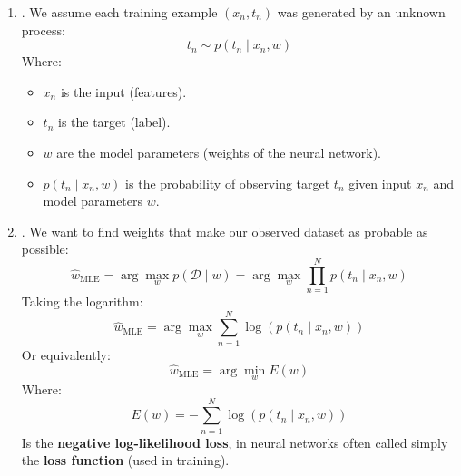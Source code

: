 \begin{enumerate}
    \item {}. We assume each training example $\left(x_{n}, t_{n}\right)$ was generated by an unknown process:
    \begin{equation*}
        t_{n} \sim p\left(t_{n} \mid x_{n}, w\right)
    \end{equation*}
    Where:
    \begin{itemize}
        \item $x_{n}$ is the input (features).
        \item $t_{n}$ is the target (label).
        \item $w$ are the model parameters (weights of the neural network).
        \item $p\left(t_{n} \mid x_{n}, w\right)$ is the probability of observing target $t_{n}$ given input $x_{n}$ and model parameters $w$.
    \end{itemize}

    \item {}. We want to find weights that make our observed dataset as probable as possible:
    \begin{equation*}
        \hat{w}_{\text{MLE}} = \arg\max_{w} p\left(\mathcal{D} \mid w\right) = \arg\max_{w} \prod_{n=1}^{N} p\left(t_{n} \mid x_{n}, w\right)
    \end{equation*}
    Taking the logarithm:
    \begin{equation*}
        \hat{w}_{\text{MLE}} = \arg\max_{w} \sum_{n=1}^{N} \log \left(p\left(t_{n} \mid x_{n}, w\right)\right)
    \end{equation*}
    Or equivalently:
    \begin{equation*}
        \hat{w}_{\text{MLE}} = \arg\min_{w} E(w)
    \end{equation*}
    Where:
    \begin{equation*}
        E(w) = -\sum_{n=1}^{N} \log \left(p\left(t_{n} \mid x_{n}, w\right)\right)
    \end{equation*}
    Is the \textbf{negative log-likelihood loss}, in neural networks often called simply the \textbf{loss function} (used in training).


\end{enumerate}

